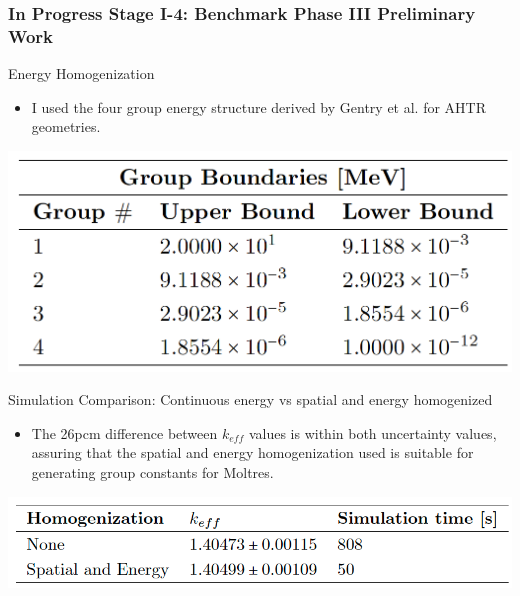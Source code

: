 \begin{frame}
    \frametitle{In Progress Stage I-4: Benchmark Phase III Preliminary Work}
    \begin{block}{Energy Homogenization}
        \begin{itemize}
            \item I used the four group energy structure derived by Gentry et al. 
            \cite{gentry_development_2016} for AHTR geometries. 
        \end{itemize}
        \vspace{-0.4cm}
        \begin{table}[]
            \centering
            \begin{minipage}[c]{0.5\textwidth}
                \centering
                \includegraphics[width=0.6\linewidth]{figures/ahtr-energy-discr.png}
            \end{minipage}\hfill
            \begin{minipage}[c]{0.5\textwidth}
            \caption{4-group energy structures for AHTR geometry 
            derived by \cite{gentry_development_2016}.}
        \end{minipage}
        \end{table}
    \end{block}
    \vspace{-0.3cm}
    \begin{block}{Simulation Comparison: Continuous energy vs spatial 
        and energy homogenized}
        \begin{itemize}
            \item The 26pcm difference between $k_{eff}$ values is within both uncertainty values, 
            assuring that the spatial and energy homogenization used is suitable for generating 
            group constants for Moltres. 
        \end{itemize}
        \vspace{-0.3cm}
        \begin{table}[]
            \centering
            \begin{minipage}[c]{0.6\textwidth}
                \centering
                \includegraphics[width=0.8\linewidth]{figures/ahtr-homogenization.png}

\end{minipage}
\end{table}
\end{block}
\end{frame}
